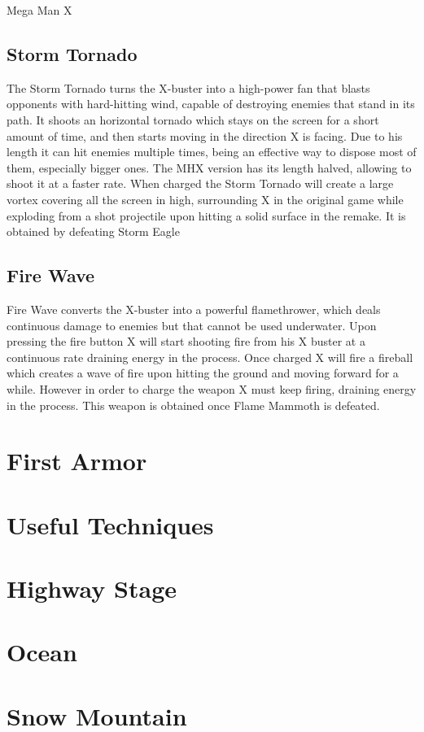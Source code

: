 \documentclass[openany]{report}
\begin{document}
\begin{chapter}{Mega Man X}
	\subsection{Storm Tornado}
	The Storm Tornado turns the X-buster into a high-power fan that blasts opponents with hard-hitting wind, capable of destroying enemies that stand in its path. It shoots an horizontal tornado which stays on the screen for a short amount of time, and then starts moving in the direction X is facing. Due to his length it can hit enemies multiple times, being an effective way to dispose most of them, especially bigger ones.  The MHX version has its length halved, allowing to shoot it at a faster rate. When charged the Storm Tornado will create a large vortex covering all the screen in high, surrounding X in the original game while exploding from a shot projectile upon hitting a solid surface in the remake.\cite{wiki:Storm_tornado} It is obtained by defeating Storm Eagle
	\subsection{Fire Wave}
	Fire Wave converts the X-buster into a powerful flamethrower, which deals continuous damage to enemies but that cannot be used underwater. Upon pressing the fire button X will start shooting fire from his X buster at a continuous rate draining energy in the process. Once charged X will fire a fireball which creates a wave of fire upon hitting the ground and moving forward for a while. However in order to charge the weapon X must keep firing, draining energy in the process. This weapon is obtained once Flame Mammoth is defeated. 
	\section{First Armor}\label{X1:Armor}
	\section{Useful Techniques}
	\section{Highway Stage}
	\section{Ocean}
	\section{Snow Mountain}

\end{chapter}
\end{document}
